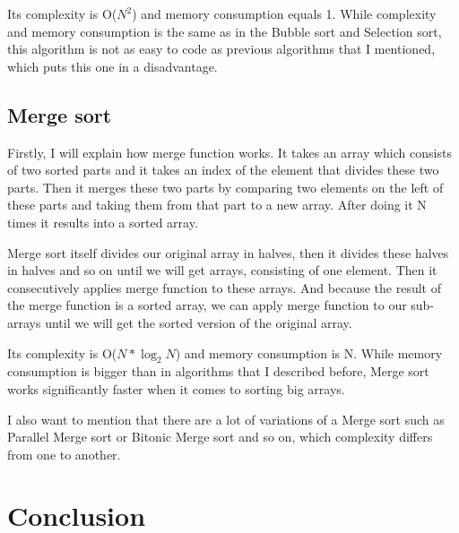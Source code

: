 \documentclass[12pt,oneside,a4paper]{article}
\begin{document}
Its complexity is O($N^{2}$) and memory consumption equals 1. While complexity and memory consumption is the same as in the Bubble sort and Selection sort, this algorithm is not as easy to code as previous algorithms that I mentioned, which puts this one in a disadvantage.

\subsection{Merge sort}
Firstly, I will explain how merge function works. It takes an array which consists of two sorted parts and it takes an index of the element that divides these two parts. Then it merges these two parts by comparing two elements on the left of these parts and taking them from that part to a new array. After doing it N times it results into a sorted array.

Merge sort itself divides our original array in halves, then it divides these halves in halves and so on until we will get arrays, consisting of one element. Then it consecutively applies merge function to these arrays. And because the result of the merge function is a sorted array, we can apply merge function to our sub-arrays until we will get the sorted version of the original array.

Its complexity is O($N*\log_2N$) and memory consumption is N. While memory consumption is bigger than in algorithms that I described before, Merge sort works significantly faster when it comes to sorting big arrays. 

I also want to mention that there are a lot of variations of a Merge sort such as Parallel Merge sort or Bitonic Merge sort and so on, which complexity differs from one to another.\cite{merge}

\section{Conclusion} \label{conclusion} 



\end{document}
